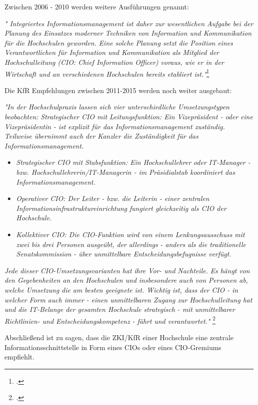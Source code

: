 Zwischen 2006 - 2010 werden weitere Ausführungen genannt:

\textit{" Integriertes Informationsmanagement ist daher zur wesentlichen Aufgabe bei der Planung des 
	Einsatzes moderner Techniken von Information und Kommunikation für die Hochschulen geworden. 
	Eine solche Planung setzt die Position eines Verantwortlichen für Information und Kommunikation 
	als Mitglied der Hochschulleitung (CIO: Chief Information Officer) voraus, wie er in der Wirtschaft 
	und an verschiedenen Hochschulen bereits etabliert ist."}\footcite[16]{zki_studie_cio_2014}

Die KfR Empfehlungen zwischen 2011-2015 werden noch weiter ausgebaut:

\textit{"In der Hochschulpraxis lassen sich vier unterschiedliche Umsetzungstypen beobachten:  Strategischer CIO mit Leitungsfunktion: Ein Vizepräsident - oder eine Vizepräsidentin - ist explizit für das Informationsmanagement zuständig. Teilweise übernimmt auch der Kanzler die Zuständigkeit für das Informationsmanagement.}

\begin{itemize}
	\item \textit{Strategischer CIO mit Stabsfunktion: Ein Hochschullehrer oder IT-Manager - 
		bzw. Hochschullehrerin/IT-Managerin - im Präsidialstab koordiniert das Informationsmanagement.} 
	\item \textit{Operativer CIO: Der Leiter - bzw. die Leiterin - einer zentralen 
		Informationsinfrastruktureinrichtung fungiert gleichzeitig als CIO der Hochschule.}
	\item \textit{Kollektiver CIO: Die CIO-Funktion wird von einem Lenkungsausschuss mit zwei bis 
		drei Personen ausgeübt, der allerdings - anders als die traditionelle Senatskommission - über 
		unmittelbare Entscheidungsbefugnisse verfügt.}
\end{itemize}
\textit{Jede dieser CIO-Umsetzungsvarianten hat ihre Vor- und Nachteile. Es hängt von den 
	Gegebenheiten an den Hochschulen und insbesondere auch von Personen ab, welche 
	Umsetzung die am besten geeignete ist. Wichtig ist, dass der CIO - in welcher Form 
	auch immer - einen unmittelbaren Zugang zur Hochschulleitung hat und die IT-Belange 
	der gesamten Hochschule strategisch - mit unmittelbarer Richtlinien- und 
	Entscheidungskompetenz - fährt und verantwortet."} \footcite[17]{zki_studie_cio_2014}

Abschließend ist zu sagen, dass die ZKI/KfR einer Hochschule eine zentrale Informationsschnittstelle in Form eines CIOs oder eines CIO-Gremiums empfiehlt.

